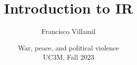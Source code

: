 \documentclass[aspectratio=43]{beamer}
\title{\huge Introduction to IR}
\author{Francisco Villamil}
\date{War, peace, and political violence\\UC3M, Fall 2023}
\begin{document}
\begin{frame}
  \titlepage
\end{frame}
\end{document}
